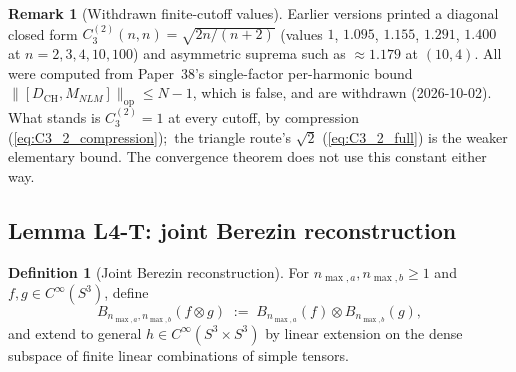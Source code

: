 \documentclass[11pt,a4paper]{article}
\theoremstyle{plain}
\theoremstyle{definition}
\newtheorem{definition}[theorem]{Definition}
\newtheorem{remark}[theorem]{Remark}
\newcommand{\nmaxa}{n_{\max,a}}
\newcommand{\nmaxb}{n_{\max,b}}
\newcommand{\sthree}{S^{3}}
\newcommand{\opnorm}[1]{\lVert #1 \rVert_{\mathrm{op}}}
\newcommand{\Mat}{M}
\newcommand{\DCH}{D_{\mathrm{CH}}}
\begin{document}
\begin{remark}[Withdrawn finite-cutoff values]\label{rem:C3_2_diagonal}\label{rem:asymmetric_sup}
Earlier versions printed a diagonal closed form
$C_3^{(2)}(n, n) = \sqrt{2n/(n+2)}$ (values $1$, $1.095$, $1.155$,
$1.291$, $1.400$ at $n = 2, 3, 4, 10, 100$) and asymmetric suprema such
as $\approx 1.179$ at $(10, 4)$.  All were computed from Paper~38's
single-factor per-harmonic bound $\opnorm{[\DCH, \Mat_{NLM}]} \le N - 1$,
which is false, and are withdrawn (2026-10-02).  What stands is
$C_3^{(2)} = 1$ at every cutoff, by compression
(\eqref{eq:C3_2_compression});\ the triangle route's $\sqrt 2$
(\eqref{eq:C3_2_full}) is the weaker elementary bound.  The convergence
theorem does not use this constant either way.
\end{remark}

\subsection{Lemma L4-T: joint Berezin reconstruction}\label{sec:L4-T}

\begin{definition}[Joint Berezin reconstruction]\label{def:joint_berezin}
For $\nmaxa, \nmaxb \ge 1$ and $f, g \in C^\infty(\sthree)$, define
\begin{equation}\label{eq:B_joint_def}
   B_{\nmaxa, \nmaxb}(f \otimes g)
   \;:=\; B_{\nmaxa}(f) \otimes B_{\nmaxb}(g),
\end{equation}
and extend to general $h \in C^\infty(\sthree \times \sthree)$ by
linear extension on the dense subspace of finite linear combinations
of simple tensors.
\end{definition}
\end{document}
